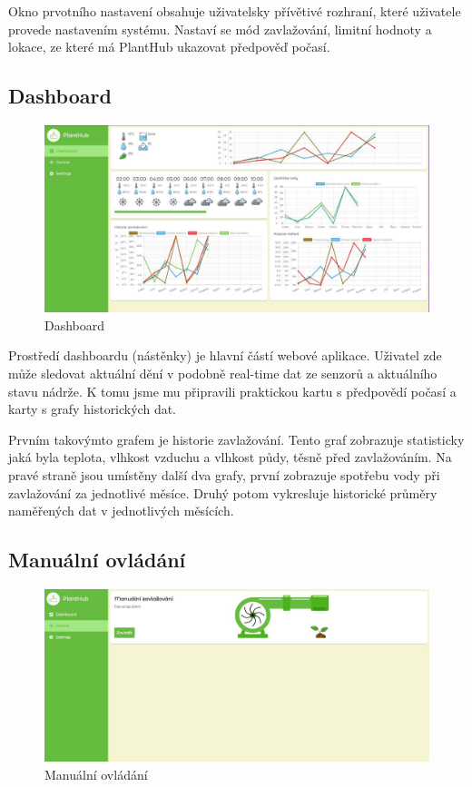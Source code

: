 \documentclass[czech,12pt,a4paper]{article}
\begin{document}
Okno prvotního nastavení obsahuje uživatelsky přívětivé rozhraní, které uživatele provede nastavením systému. Nastaví se mód zavlažování, limitní hodnoty a lokace, ze které má PlantHub ukazovat předpověď počasí.

\clearpage

\subsection{Dashboard}

\begin{figure}[h]
	\centering
	\includegraphics[width=\linewidth]{web-ui.png}
	\caption{Dashboard}
\end{figure}

Prostředí dashboardu (nástěnky) je hlavní částí webové aplikace. Uživatel zde může sledovat aktuální dění v podobně real-time dat ze senzorů a aktuálního stavu nádrže. K tomu jsme mu připravili praktickou kartu s předpovědí počasí a karty s grafy historických dat.

Prvním takovýmto grafem je historie zavlažování. Tento graf zobrazuje statisticky jaká byla teplota, vlhkost vzduchu a vlhkost půdy, těsně před zavlažováním. Na pravé straně jsou umístěny další dva grafy, první zobrazuje spotřebu vody při zavlažování za jednotlivé měsíce. Druhý potom vykresluje historické průměry naměřených dat v jednotlivých měsících.

\clearpage

\subsection{Manuální ovládání}

\begin{figure}[h]
	\centering
	\includegraphics[width=\linewidth]{web-ui-pump.png}
	\caption{Manuální ovládání}
\end{figure}
\end{document}
